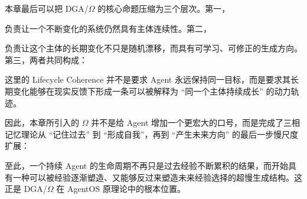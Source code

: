 本章最后可以把 DGA/$\Omega$ 的核心命题压缩为三个层次。第一，
\begin{statementbox}
\centering
{}
\end{statementbox}
负责让一个不断变化的系统仍然具有主体连续性。第二，
\begin{statementbox}
\centering
{}
\end{statementbox}
负责让这个主体的长期变化不只是随机漂移，而具有可学习、可修正的生成方向。第三，两者共同构成：
\begin{statementbox}
\centering
{}
\end{statementbox}
这里的 Lifecycle Coherence 并不是要求 Agent 永远保持同一目标，而是要求其长期变化能够在现实反馈下形成一条可以被解释为 ``同一个主体持续成长'' 的动力轨迹。

因此，本章所引入的 $\Omega$ 并不是给 Agent 增加一个更宏大的口号，而是完成了三相记忆理论从 ``记住过去'' 到 ``形成自我''，再到 ``产生未来方向'' 的最后一步慢尺度扩展：
\begin{statementbox}
\centering
{}
\end{statementbox}
至此，一个持续 Agent 的生命周期不再只是过去经验不断累积的结果，而开始具有一种可以被经验逐渐塑造、又能够反过来塑造未来经验选择的超慢生成结构。这正是 DGA/$\Omega$ 在 AgentOS 原理论中的根本位置。
